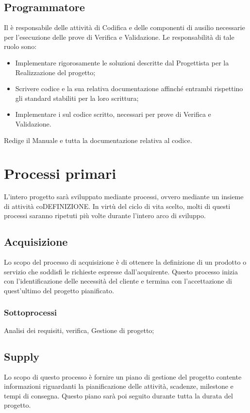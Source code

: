 \subsection{Programmatore}
\label{2.6}
Il  è responsabile delle attività di Codifica e delle componenti di ausilio
necessarie per l'esecuzione delle prove di Verifica e Validazione. Le responsabilità di tale ruolo sono:
\begin{itemize}
\item Implementare rigorosamente le soluzioni descritte dal Progettista per la Realizzazione del progetto;
\item Scrivere codice e la sua relativa documentazione affinché entrambi rispettino gli standard stabiliti per la loro scrittura;
\item Implementare i  sul codice scritto, necessari per prove di Verifica e Validazione.
\end{itemize}
Redige il Manuale  e tutta la documentazione relativa al codice.

\newpage
\section{Processi primari}
L'intero progetto sarà sviluppato mediante processi, ovvero mediante un insieme di attività coDEFINIZIONE.
In virtù del ciclo di vita scelto, molti di questi processi saranno ripetuti più volte durante l'intero arco di sviluppo.

\subsection{Acquisizione}
Lo scopo del processo di acquisizione è di ottenere la definizione di un prodotto o servizio che soddisfi le richieste espresse dall'acquirente.
Questo processo inizia con l'identificazione delle necessità del cliente e termina con l'accettazione di quest'ultimo del progetto pianificato.
\subsubsection{Sottoprocessi}
Analisi dei requisiti, verifica, Gestione di progetto;
\subsection{Supply}
Lo scopo di questo processo è fornire un piano di gestione del progetto contente informazioni riguardanti la pianificazione delle attività, scadenze, milestone e tempi di consegna. Questo piano sarà poi seguito durante tutta la durata del progetto.
